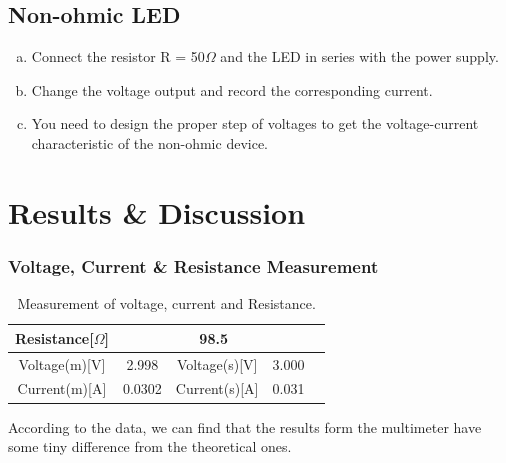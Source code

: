 \documentclass{article}
\begin{document}
\subsection{Non-ohmic LED}
\begin{enumerate}[a)]
\item
Connect the resistor R = 50$\Omega$ and the LED in series with the power supply.
\item
Change the voltage output and record the corresponding current.
\item
You need to design the proper step of voltages to get the voltage-current characteristic of the non-ohmic device.
\end{enumerate}
\section{Results \& Discussion}
\subsubsection{Voltage, Current \& Resistance Measurement}
\begin{table}[!h]
\begin{center}
\begin{tabular}{|c|c|c|c|c|}
\hline
Resistance[$\Omega$]	&	\multicolumn{3}{|c|}{98.5}\\
\hline
Voltage(m)[V]	&	2.998	&	Voltage(s)[V]	&	3.000\\
\hline
Current(m)[A]	&	0.0302	&	Current(s)[A]	&	0.031\\
\hline
\end{tabular}
\caption{Measurement of voltage, current and Resistance.}
\label{tab-1}
\end{center}
\end{table}
According to the data, we can find that the results form the multimeter have some tiny difference from the theoretical ones.
\end{document}
